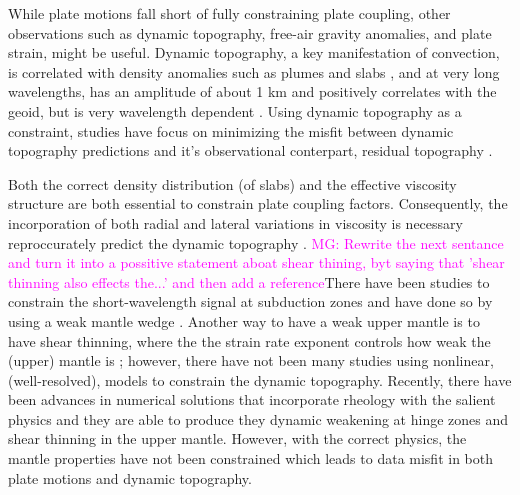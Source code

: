 \documentclass[12pt]{article}
\newcommand{\mgnote}[1]{\textcolor{magenta}{MG: #1}}
\begin{document}
While plate motions fall short of fully constraining plate coupling, other observations such as dynamic topography, free-air gravity anomalies, and plate strain, might be useful.  Dynamic topography, a key manifestation of convection,
is correlated with density anomalies such as plumes and slabs \citep{hager1984lower}, and at very long wavelengths, has an amplitude of about 1 km and positively correlates with the geoid, but is very wavelength dependent \citep{flament2013review}. Using dynamic topography as a constraint, studies have focus on minimizing the misfit between dynamic topography predictions and it's observational conterpart, residual topography \citep{yang2016dynamic}. 

Both the correct density distribution (of slabs) and the effective viscosity structure are both essential to constrain plate coupling factors. Consequently, the incorporation of both radial and lateral variations in viscosity is necessary  reproccurately predict the dynamic topography \citep{moresi1996constraints,kaufmann2000mantle}. 
\mgnote{Rewrite the next sentance and turn it into a possitive statement aboat shear thining, byt saying that 'shear thinning also effects the...' and then add a reference}There have been studies to constrain the short-wavelength signal at subduction zones and have done so by using a weak mantle wedge \citep{billen2001low}. Another way to have a weak upper mantle is to have shear thinning, where the the strain rate exponent controls how weak the (upper) mantle is \citep{karato1993rheology}; however, there have not been many studies using nonlinear, (well-resolved), models to constrain the dynamic topography. Recently, there have been advances in numerical solutions that incorporate rheology with the salient physics and they are able to produce they dynamic weakening at hinge zones and shear thinning in the upper mantle. However, with the correct physics, the mantle properties have not been constrained \citep{Stadler27082010,JGRB17312} which leads to data misfit in both plate motions and dynamic topography.
\end{document}
